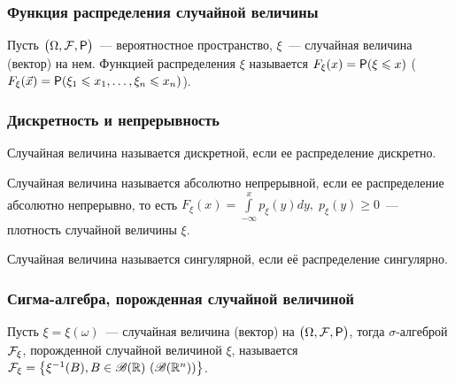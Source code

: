 \subsubsection*{ Функция распределения случайной величины}
\begin{definition}
	Пусть $\big(\Omega, \F, \P\big)$~--- вероятностное пространство, $\xi$~--- случайная величина (вектор) на нем. Функцией распределения $\xi$ называется $F_\xi(x) = \P(\xi \leqslant x)$ ($F_\xi(\vec x) = \P(\xi_1 \leqslant x_1, \ldots, \xi_n \leqslant x_n)$).
\end{definition}

\subsubsection*{ Дискретность и непрерывность}
\begin{definition}
	Случайная величина называется дискретной, если ее распределение дискретно.
\end{definition}

\begin{definition}
	Случайная величина называется абсолютно непрерывной, если ее распределение абсолютно непрерывно, то есть $F_\xi(x) = \int\limits_{-\infty}^xp_\xi(y)dy,\; p_\xi(y) \geqslant 0$~--- плотность случайной величины $\xi$.
\end{definition}

\begin{definition}
    Случайная величина называется сингулярной, если её распределение сингулярно.
\end{definition}

\subsubsection*{ Сигма-алгебра, порожденная случайной величиной}
\begin{definition}
	Пусть $\xi = \xi(\omega)$~--- случайная величина (вектор) на $\big(\Omega, \F, \P\big)$, тогда $\sigma$-алгеброй $\F_\xi$, порожденной случайной величиной $\xi$, называется $\F_\xi = \big\{\xi^{-1}(B), B \in \B(\R)\ (\B(\R^n)) \big\}$.
\end{definition}
